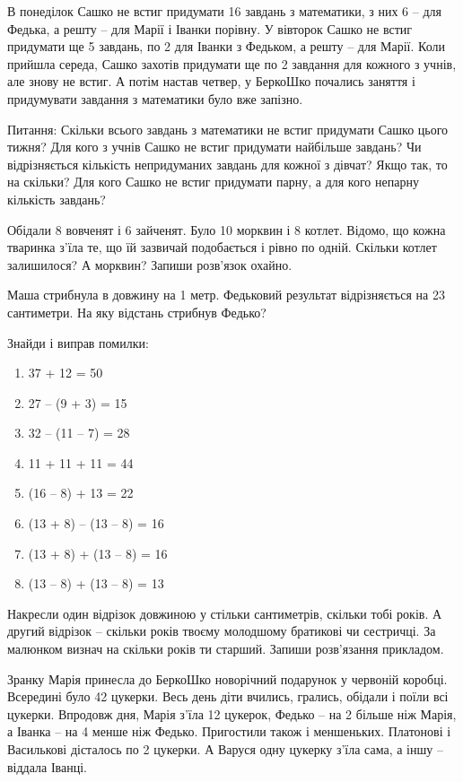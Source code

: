 \problem
В понеділок Сашко не встиг придумати 16 завдань з математики,
з них 6 – для Федька, а решту – для Марії і Іванки порівну. 
У вівторок Сашко не встиг придумати ще 5 завдань,
по 2 для Іванки з Федьком, а решту – для Марії. 
Коли прийшла середа, Сашко захотів придумати
ще по 2 завдання для кожного з учнів, але знову не встиг. 
А потім настав четвер, у БеркоШко почались заняття
і придумувати завдання з математики було вже запізно.

Питання:
Скільки всього завдань з математики не встиг придумати Сашко цього тижня?
Для кого з учнів Сашко не встиг придумати найбільше завдань?
Чи відрізняється кількість непридуманих завдань для кожної з дівчат?
Якщо так, то на скільки?
Для кого Сашко не встиг придумати парну, а для кого непарну кількість завдань?


\problem
Обідали 8 вовченят і 6 зайченят. Було 10 морквин і 8 котлет.
Відомо, що кожна тваринка з'їла те, що їй зазвичай подобається
і рівно по одній.
Скільки котлет залишилося? А морквин? Запиши розв'язок охайно.


\problem
Маша стрибнула в довжину на 1 метр.
Федьковий результат відрізняється на 23 сантиметри.
На яку відстань стрибнув Федько?


\problem
Знайди і виправ помилки:
\begin{multicols}{2}
    \begin{enumerate}
        \item 37 + 12 = 50
        \item 27 – (9 + 3) = 15
        \item 32 – (11 – 7) = 28
        \item 11 + 11 + 11 = 44
        \item (16 – 8) + 13 = 22
        \item (13 + 8) – (13 – 8) = 16
        \item (13 + 8) + (13 – 8) = 16
        \item (13 – 8) + (13 – 8) = 13
    \end{enumerate}
\end{multicols}


\problem
Накресли один відрізок довжиною у стільки сантиметрів, скільки тобі років.
А другий відрізок – скільки років твоєму молодшому братикові чи сестричці.
За малюнком визнач на скільки років ти старший.
Запиши розв’язання прикладом.


\problem
Зранку Марія принесла до БеркоШко новорічний подарунок у червоній коробці.
Всередині було 42 цукерки.
Весь день діти вчились, грались, обідали і поїли всі цукерки.
Впродовж дня, Марія з’їла 12 цукерок, Федько – на 2 більше ніж Марія,
а Іванка – на 4 менше ніж Федько.
Пригостили також і меншеньких. Платонові і Василькові дісталось по 2 цукерки.
А Варуся одну цукерку з’їла сама, а іншу – віддала Іванці.

